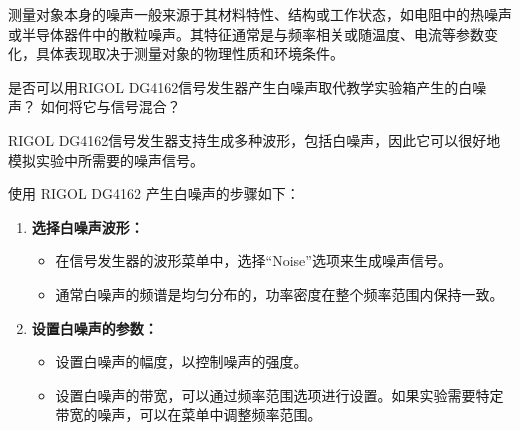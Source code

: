 \documentclass[dvipsnames, svgnames,a4paper,11pt]{article}
\begin{document}
	测量对象本身的噪声一般来源于其材料特性、结构或工作状态，如电阻中的热噪声或半导体器件中的散粒噪声。其特征通常是与频率相关或随温度、电流等参数变化，具体表现取决于测量对象的物理性质和环境条件。






\begin{question}
	是否可以用RIGOL DG4162信号发生器产生白噪声取代教学实验箱产生的白噪声？ 如何将它与信号混合？
\end{question}

	RIGOL DG4162信号发生器支持生成多种波形，包括白噪声，因此它可以很好地模拟实验中所需要的噪声信号。

	使用 RIGOL DG4162 产生白噪声的步骤如下：
	\begin{enumerate}
		\item \textbf{选择白噪声波形：}
			\begin{itemize}
				\item 在信号发生器的波形菜单中，选择“Noise”选项来生成噪声信号。
				\item 通常白噪声的频谱是均匀分布的，功率密度在整个频率范围内保持一致。
			\end{itemize}
			
		\item \textbf{设置白噪声的参数：}
			\begin{itemize}
				\item 设置白噪声的幅度，以控制噪声的强度。
				\item 设置白噪声的带宽，可以通过频率范围选项进行设置。如果实验需要特定带宽的噪声，可以在菜单中调整频率范围。
			\end{itemize}
			
	\end{enumerate}
\end{document}
